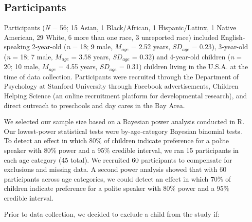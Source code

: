 \documentclass[
  english,
  man,floatsintext]{apa6}
\begin{document}
\hypertarget{participants}{%
\subsection{Participants}\label{participants}}

Participants (\emph{N} = 56; 15 Asian, 1 Black/African, 1 Hispanic/Latinx, 1 Native American, 29 White, 6 more than one race, 3 unreported race) included English-speaking 2-year-old (\emph{n} = 18; 9 male, \(M_{age}\) = 2.52 years, \(SD_{age}\) = 0.23), 3-year-old (\emph{n} = 18; 7 male, \(M_{age}\) = 3.58 years, \(SD_{age}\) = 0.32) and 4-year-old children (\emph{n} = 20; 10 male, \(M_{age}\) = 4.55 years, \(SD_{age}\) = 0.31) children living in the U.S.A. at the time of data collection. Participants were recruited through the Department of Psychology at Stanford University through Facebook advertisements, Children Helping Science (an online recruitment platform for developmental research), and direct outreach to preschools and day cares in the Bay Area.

We selected our sample size based on a Bayesian power analysis conducted in R. Our lowest-power statistical tests were by-age-category Bayesian binomial tests. To detect an effect in which 80\% of children indicate preference for a polite speaker with 80\% power and a 95\% credible interval, we ran 15 participants in each age category (45 total). We recruited 60 participants to compensate for exclusions and missing data. A second power analysis showed that with 60 participants across age categories, we could detect an effect in which 70\% of children indicate preference for a polite speaker with 80\% power and a 95\% credible interval.

Prior to data collection, we decided to exclude a child from the study if:
\end{document}
